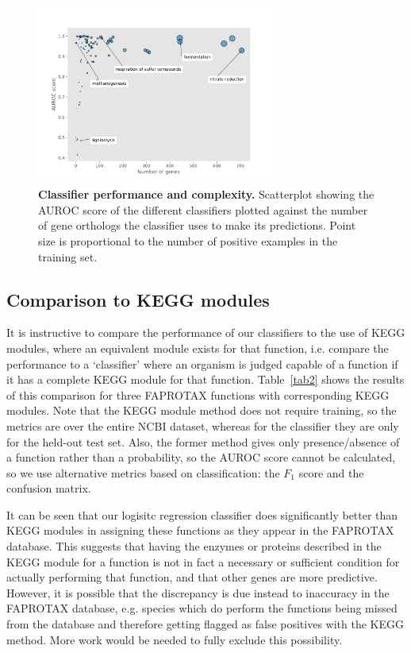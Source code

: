 \documentclass[10pt,letterpaper]{article}
\begin{document}
\begin{figure}
\includegraphics[width=0.7\textwidth]{fig3}
\caption{{\bf Classifier performance and complexity.}
Scatterplot showing the AUROC score of the different classifiers plotted against the number of gene orthologs the classifier uses to make its predictions. Point size is proportional to the number of positive examples in the training set.}
\label{fig3}
\end{figure}

\subsection*{Comparison to KEGG modules}
It is instructive to compare the performance of our classifiers to the use of KEGG modules, where an equivalent module exists for that function, i.e. compare the performance to a `classifier' where an organism is judged capable of a function if it has a complete KEGG module for that function. Table~\ref{tab2} shows the results of this comparison for three FAPROTAX functions with corresponding KEGG modules. Note that the KEGG module method does not require training, so the metrics are over the entire NCBI dataset, whereas for the classifier they are only for the held-out test set. Also, the former method gives only presence/absence of a function rather than a probability, so the AUROC score cannot be calculated, so we use alternative metrics based on classification: the $F_1$ score and the confusion matrix.

It can be seen that our logisitc regression classifier does significantly better than KEGG modules in assigning these functions as they appear in the FAPROTAX database. This suggests that having the enzymes or proteins described in the KEGG module for a function is not in fact a necessary or sufficient condition for actually performing that function, and that other genes are more predictive. However, it is possible that the discrepancy is due instead to inaccuracy in the FAPROTAX database, e.g. species which do perform the functions being missed from the database and therefore getting flagged as false positives with the KEGG method. More work would be needed to fully exclude this possibility.  
\end{document}
